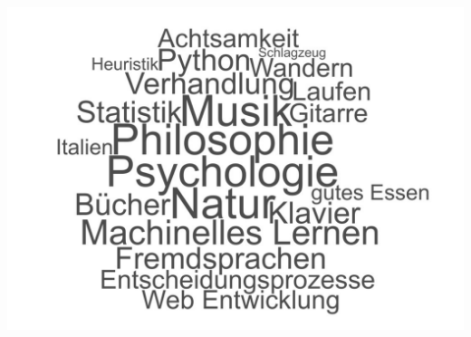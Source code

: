 \documentclass{article}
\begin{document}
\begin{minipage}{0.25\textwidth}
\begin{center}
	\centering
\vspace{4pt}
\includegraphics[trim=3cm 1cm 2cm 1cm, clip,scale=0.17]{../../img/wordcloudGER.pdf}
  \end{center}
  \vspace*{\fill}
\end{minipage}
\hfill
\end{document}
